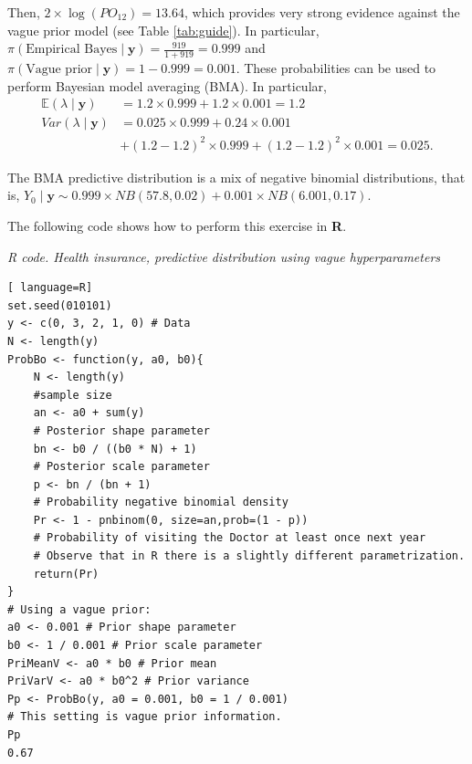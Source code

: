 Then, $2 \times \log(PO_{12}) = 13.64$, which provides very strong evidence against the vague prior model (see Table \ref{tab:guide}). In particular, $\pi(\text{Empirical Bayes} \mid \mathbf{y}) = \frac{919}{1 + 919} = 0.999$ and $\pi(\text{Vague prior} \mid \mathbf{y}) = 1 - 0.999 = 0.001$. These probabilities can be used to perform Bayesian model averaging (BMA). In particular,
\begin{align*}
	\mathbb{E}(\lambda\mid \mathbf{y})&=1.2\times 0.999+1.2\times 0.001=1.2\\
	Var(\lambda\mid \mathbf{y})&=0.025\times 0.999+0.24\times 0.001\\
	& + (1.2-1.2)^2\times 0.999 + (1.2-1.2)^2\times 0.001= 0.025.
\end{align*}

The BMA predictive distribution is a mix of negative binomial distributions, that is, $Y_0\mid \mathbf{y}\sim 0.999\times NB(57.8, 0.02)+0.001\times NB(6.001, 0.17)$.

The following code shows how to perform this exercise in \textbf{R}.

\begin{tcolorbox}[enhanced,width=4.67in,center upper,
	fontupper=\large\bfseries,drop shadow southwest,sharp corners]
\textit{R code. Health insurance, predictive distribution using vague hyperparameters}
\begin{VF}
\begin{lstlisting}[ language=R]
set.seed(010101)
y <- c(0, 3, 2, 1, 0) # Data
N <- length(y)
ProbBo <- function(y, a0, b0){
	N <- length(y)
	#sample size
	an <- a0 + sum(y) 
	# Posterior shape parameter
	bn <- b0 / ((b0 * N) + 1) 
	# Posterior scale parameter
	p <- bn / (bn + 1) 
	# Probability negative binomial density
	Pr <- 1 - pnbinom(0, size=an,prob=(1 - p)) 
	# Probability of visiting the Doctor at least once next year
	# Observe that in R there is a slightly different parametrization.
	return(Pr)
} 
# Using a vague prior:
a0 <- 0.001 # Prior shape parameter
b0 <- 1 / 0.001 # Prior scale parameter
PriMeanV <- a0 * b0 # Prior mean
PriVarV <- a0 * b0^2 # Prior variance
Pp <- ProbBo(y, a0 = 0.001, b0 = 1 / 0.001) 
# This setting is vague prior information.
Pp
0.67
\end{lstlisting}
\end{VF}
\end{tcolorbox} 

